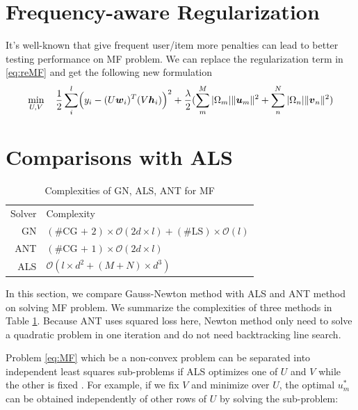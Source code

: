 \documentclass[11pt,twoside]{article}
\newcommand{\bsym}[1]{\ensuremath{\boldsymbol{#1}}}
\newcommand{\bw}{\ensuremath{\bsym{w}}}
\newcommand{\bh}{\ensuremath{\bsym{h}}}
\newcommand{\bu}{\ensuremath{\bsym{u}}}
\newcommand{\bv}{\ensuremath{\bsym{v}}}
\newcommand{\bbO}[1]{\ensuremath{\mathcal{O}\left(#1\right)}}
\begin{document}
\section{Frequency-aware Regularization}
It's well-known that give frequent user/item more penalties can lead to better testing performance on MF problem. We can replace the regularization term in \eqref{eq:reMF} and get the following new formulation
\begin{equation}
    \min_{U,V}  \quad \frac{1}{2}\sum_{i}^l  \Bigl(y_i - (U \bw_i)^T (V \bh_i)\Bigr)^2+
    \frac{\lambda}{2} (\sum^{M}_m |\Omega_{m}| \|\bu_m\|^2 +\sum^{N}_{n} |\Omega_{n}| \|\bv_n\|^2)
    \label{eq:faMF}
\end{equation}

\section{Comparisons with ALS}

\begin{table}[H]
\centering
\begin{tabular}{r|l}
 Solver& Complexity  \\
 GN &  $(\text{\#CG + 2}) \times \bbO{2d \times l} + (\text{\#LS})\times \bbO{l}$\\
 ANT& $(\text{\#CG + 1}) \times \bbO{2d \times l}$\\
 ALS&  $\bbO {l \times d^2 + (M+N) \times d^3}$ 
\end{tabular}
\caption{Complexities of GN, ALS, ANT for MF}
\label{tab:com}
\end{table}

In this section, we compare Gauss-Newton method with ALS and ANT method on solving MF problem. 
We summarize the complexities of three methods in Table \ref{tab:com}. Because ANT uses squared loss here, Newton method only need to solve a quadratic problem in one iteration and do not need backtracking line search.

Problem \eqref{eq:MF} which be a non-convex problem can be separated into independent least squares sub-problems if ALS optimizes one of $U$ and $V$ while the other is fixed \citep{HFY14a-short}. For example, if we fix $V$ and minimize over $U$, the optimal $u_m^*$ can be obtained independently of other rows of $U$ by solving the sub-problem:
\end{document}
